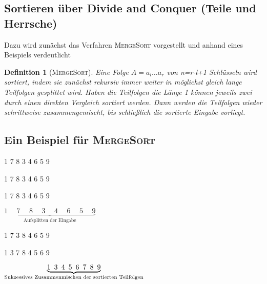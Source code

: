 \documentclass[ngerman,draft,parskip=half*,twoside]{scrreprt}
\theoremstyle{break}
\newtheorem{definition}{Definition}[chapter]
\theoremstyle{nonumberbreak}
\begin{document}
\subsection{Sortieren über Divide and Conquer (Teile und Herrsche)}
%
%
Dazu wird zunächst das Verfahren \textsc{MergeSort} vorgestellt und anhand eines Beispiels verdeutlicht
\begin{definition}[\textsc{MergeSort}]
        Eine Folge $A=a_l\ldots a_r$ von n=r-l+1 Schlüsseln wird sortiert, indem sie zunächst rekursiv immer weiter
	in möglichst gleich lange Teilfolgen gesplittet wird. Haben die Teilfolgen die Länge 1 können jeweils zwei durch einen direkten
	Vergleich sortiert werden. Dann werden die Teilfolgen wieder schrittweise zusammengemischt, bis schließlich die sortierte Eingabe
	vorliegt. 
\end{definition}

\subsection{Ein Beispiel für \textsc{MergeSort}}

\begin{center}
1 7 8 3 4 6 5 9
\medskip

1 7 8 3 \hspace{10pt} 4 6 5 9
\medskip

1 7 \hspace{10pt} 8 3 \hspace{10pt} 4 6 \hspace{10pt} 5 9
\medskip

$\underbrace{1 \hspace{15pt} 7 \hspace{15pt} 8 \hspace{15pt} 3 \hspace{15pt} 4 \hspace{15pt} 6 \hspace{15pt} 5 \hspace{15pt}
9}_{\text{Aufsplitten der Eingabe}}$
\medskip

1 7 \hspace{10pt} 3 8 \hspace{10pt} 4 6 \hspace{10pt} 5 9
\medskip

1 3 7 8 \hspace{10pt} 4 5 6 9
\medskip  

$\underbrace{1 \hspace{5pt} 3 \hspace{5pt} 4 \hspace{5pt} 5 \hspace{5pt} 6 \hspace{5pt} 7 \hspace{5pt} 8 \hspace{5pt}
9}_{\textrm{\textup{Sukzessives Zusammenmischen der sortierten Teilfolgen}}}$
\end{center}
\end{document}
